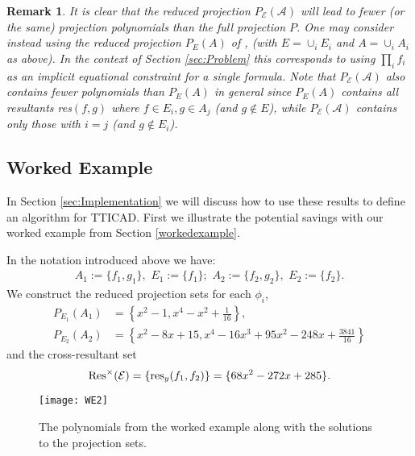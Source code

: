 \documentclass{article}
\newtheorem{remark}[theorem]{Remark}
\begin{document}
\begin{remark}
It is clear that the reduced projection $P_{\mathcal{E}}(\mathcal{A})$ will lead to fewer (or the same) projection polynomials than the full projection $P$.  
One may consider instead using the reduced projection $P_E(A)$ of \cite{McCallum1999a}, (with $E=\cup_i E_i$ and $A=\cup_i A_i$ as above).  In the context of Section \ref{sec:Problem} this corresponds to using $\prod_i f_i$ as an implicit equational constraint for a single formula.  Note that $P_{\mathcal{E}}(\mathcal{A})$ also contains fewer polynomials than $P_E(A)$ in general since $P_E(A)$ contains all resultants res$(f,g)$ where $f \in E_i, g \in A_j$ (and $g \notin E$), while $P_{\mathcal{E}}(\mathcal{A})$ contains only those with $i=j$ (and $g \notin E_i$).
\end{remark}

\subsection{Worked Example}
\label{subsec:workedexample2}

In Section \ref{sec:Implementation} we will discuss how to use these results to define an algorithm for TTICAD. First we illustrate the potential savings with our worked example from Section \ref{workedexample}.

In the notation introduced above we have:
\begin{align*}
A_1 := \{f_1,g_1\}, \,\, E_1:=\{ f_1 \}; \,\,
A_2 := \{f_2,g_2\}, \,\, E_2:=\{ f_2 \}.
\end{align*}
We construct the reduced projection sets for each $\phi_i$,
\begin{align*}
  P_{E_1}(A_1) &= \left\{ x^2-1, x^4 - x^2 + \tfrac{1}{16} \right\}, \\
  P_{E_2}(A_2) &= \left\{ x^2 - 8x +15, x^4 -16x^3 + 95x^2-248x + \tfrac{3841}{16} \right\}
\end{align*}
and the cross-resultant set
\begin{equation*}
{\rm Res}^{\times} (\mathcal{E}) = \{{\rm res}_{y}(f_1,f_2)\} = \{ 68x^2 -272x + 285\}.
\end{equation*}

\begin{figure}
\caption{The polynomials from the worked example along with the solutions to the projection sets.}
\label{fig:workedexample4}
\begin{center}
\texttt{[image: WE2]}
\end{center}
\vskip-10pt
\end{figure}
\end{document}
